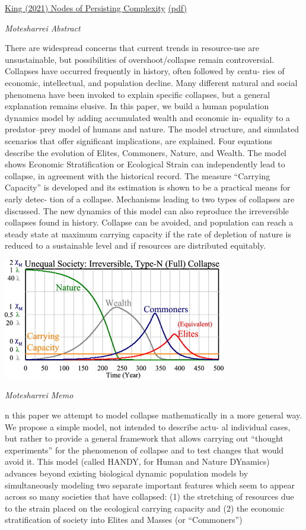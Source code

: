 \documentclass[
]{book}
\begin{document}
\href{https://www.mdpi.com/2071-1050/13/15/8161/htm}{King (2021) Nodes of Persisting Complexity}
\href{pdf/King_2021_Nodes\%20of_Persisting_Complexity.pdf}{(pdf)}

\emph{Motesharrei Abstract}

There are widespread concerns that current trends in resource-use are unsustainable, but possibilities of
overshoot/collapse remain controversial. Collapses have occurred frequently in history, often followed by centu-
ries of economic, intellectual, and population decline. Many different natural and social phenomena have been
invoked to explain specific collapses, but a general explanation remains elusive.
In this paper, we build a human population dynamics model by adding accumulated wealth and economic in-
equality to a predator--prey model of humans and nature. The model structure, and simulated scenarios that
offer significant implications, are explained. Four equations describe the evolution of Elites, Commoners, Nature,
and Wealth. The model shows Economic Stratification or Ecological Strain can independently lead to collapse, in
agreement with the historical record.
The measure ``Carrying Capacity'' is developed and its estimation is shown to be a practical means for early detec-
tion of a collapse. Mechanisms leading to two types of collapses are discussed. The new dynamics of this model
can also reproduce the irreversible collapses found in history. Collapse can be avoided, and population can reach a
steady state at maximum carrying capacity if the rate of depletion of nature is reduced to a sustainable level and if
resources are distributed equitably.

\includegraphics{fig/handy_unequal.jpg}

\emph{Motesharrei Memo}

n this paper we attempt to model collapse mathematically in a more
general way. We propose a simple model, not intended to describe actu-
al individual cases, but rather to provide a general framework that
allows carrying out ``thought experiments'' for the phenomenon of
collapse and to test changes that would avoid it. This model (called
HANDY, for Human and Nature DYnamics) advances beyond existing
biological dynamic population models by simultaneously modeling
two separate important features which seem to appear across so
many societies that have collapsed: (1) the stretching of resources due
to the strain placed on the ecological carrying capacity
and (2) the economic stratification of society into Elites and
Masses (or ``Commoners'')
\end{document}
